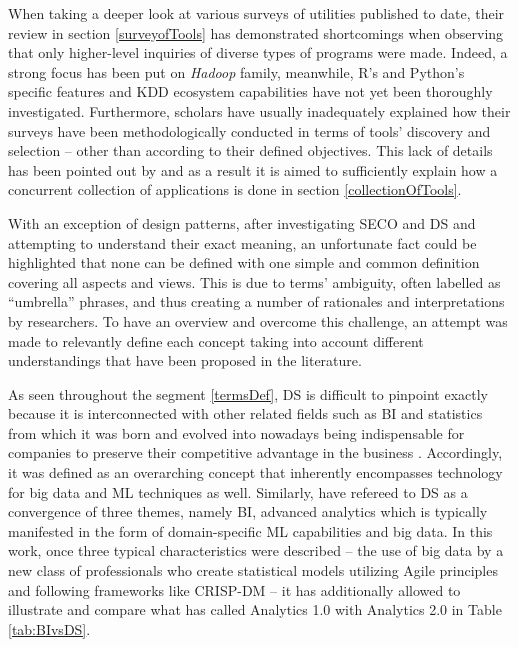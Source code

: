 When taking a deeper look at various surveys of utilities published to date, their review in section \ref{surveyofTools} has demonstrated shortcomings when observing that only higher-level inquiries of diverse types of programs were made. 
Indeed, a strong focus has been put on \emph{Hadoop} family, meanwhile, R's and Python's specific features and \ac{KDD} ecosystem capabilities have not yet been thoroughly investigated.
Furthermore, scholars have usually inadequately explained how their surveys have been methodologically conducted in terms of tools' discovery and selection -- other than according to their defined objectives. 
This lack of details has been pointed out by \textcite{JansenHarrie2010} and as a result it is aimed to sufficiently explain how a concurrent collection of applications is done in section \ref{collectionOfTools}.

With an exception of design patterns, after investigating \ac{SECO} and \ac{DS} and attempting to understand their exact meaning, an unfortunate fact could be highlighted that none can be defined with one simple and common definition covering all aspects and views.
This is due to terms' ambiguity, often labelled as \enquote{umbrella} phrases, and thus creating a number of rationales and interpretations by researchers.
To have an overview and overcome this challenge, an attempt was made to relevantly define each concept taking into account different understandings that have been proposed in the literature.

As seen throughout the segment \ref{termsDef}, \ac{DS} is difficult to pinpoint exactly because it is interconnected with other related fields such as \ac{BI} and statistics from which it was born and evolved into nowadays being indispensable for companies to preserve their competitive advantage in the business \parencite{Provost201351}.
Accordingly, it was defined as an overarching concept that inherently encompasses technology for big data and \ac{ML} techniques as well.
Similarly, \textcite{Ayankoya2014} have refereed to \ac{DS} as a convergence of three themes, namely \ac{BI}, advanced analytics which is typically manifested in the form of domain-specific \ac{ML} capabilities and big data.
In this work, once three typical characteristics were described -- the use of big data by a new class of professionals who create statistical models utilizing Agile principles and following frameworks like \ac{CRISP-DM} -- it has additionally allowed to illustrate and compare what \textcite{Davenport2013Analytics3.0} has called Analytics 1.0 with Analytics 2.0 in Table \ref{tab:BIvsDS}.

